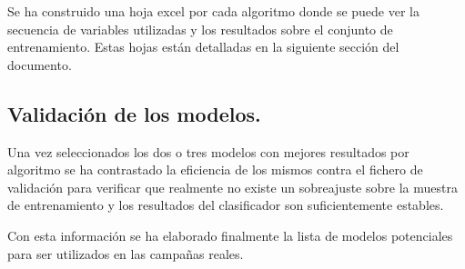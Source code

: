Se ha construido una hoja excel por cada algoritmo donde se puede ver la secuencia de variables utilizadas y los resultados sobre el conjunto de entrenamiento. Estas hojas están detalladas en la siguiente sección del documento.

\subsection{Validación de los modelos.}

Una vez seleccionados los dos o tres modelos con mejores resultados por algoritmo se ha contrastado la eficiencia de los mismos contra el fichero de validación para verificar que realmente no existe un sobreajuste sobre la muestra de entrenamiento y los resultados del clasificador son suficientemente estables. 

Con esta información se ha elaborado finalmente la lista de modelos potenciales para ser utilizados en las campañas reales.